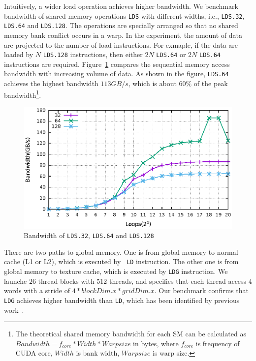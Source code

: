 \documentclass{sig-alternate-05-2015}
\begin{document}
Intuitively, a wider load operation achieves higher bandwidth. We benchmark bandwidth of shared memory operations {\tt LDS} with different widths, i.e., {\tt LDS.32}, {\tt LDS.64}
and {\tt LDS.128}. The operations are specially arranged so that no shared memory bank conflict occurs in a warp. In the
experiment, the amount of data are projected to the number of load instructions. For exmaple, if the data are loaded by
$N$ {\tt LDS.128} instructions, then either $2N$ {\tt LDS.64} or $2N$ {\tt LDS.64} instructions are required.
Figure~\ref{fig:lds_bw} compares the sequential memory access bandwidth with increasing volume of data. As shown in the figure, {\tt LDS.64} achieves the highest bandwidth $113GB/s$, which is about $60\%$ of the peak bandwidth\footnote{The theoretical shared memory bandwidth for each SM can be calculated as $Bandwidth=f_{core}*Width*Warpsize$ in
bytes, where $f_{core}$ is frequency of CUDA core, $Width$ is bank width, $Warpsize$ is warp size.}.

\begin{figure}[htbp]
\begin{center}
\includegraphics[scale=0.6]{lds_bandwidth}
    \caption{ Bandwidth of {\tt LDS.32}, {\tt LDS.64} and {\tt LDS.128}}
\label{fig:lds_bw}
\end{center}
\end{figure}

There are two paths to global memory. One is from global memory to normal cache (L1 or L2), which is executed by {\tt
LD} instruction. The other one is from global memory to texture cache, which is executed by {\tt LDG} instruction. We
launche $26$ thread blocks with $512$ threads, and specifies that each thread access $4$ words with a stride of
$4*blockDim.x*gridDim.x$. Our benchmark confirms that {\tt LDG} achieves higher bandwidth than {\tt LD}, which has been
identified by previous work~\cite{tan}.
\end{document}
